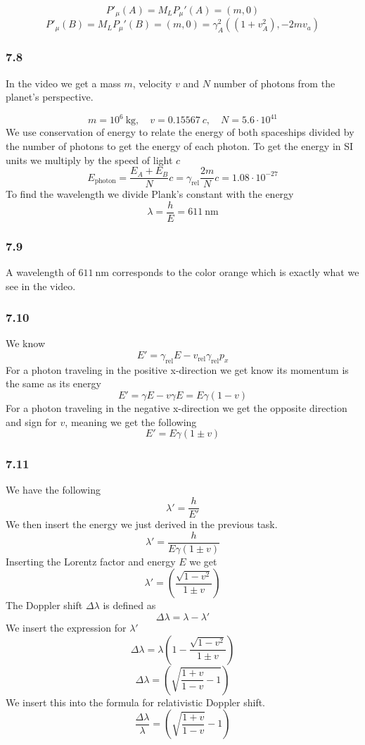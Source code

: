 \documentclass[reprint,english,notitlepage]{revtex4-2}
\begin{document}
\[
P'_{μ}(A) = M_L P_{μ}'(A) = (m,0)
\]
\[
  P'_{μ}(B) = M_L P_{μ}'(B) = (m,0) = γ^{2}_{A}((1 + v^{2}_{A}), - 2mv_{a})
\]

\subsubsection*{7.8}
In the video we get a mass $ m $, velocity $ v $ and $ N $ number of photons from the planet's perspective. 

\[
m = 10^{6}\ \text{kg}, \quad v = 0.15567\ c, \quad N = 5.6 ⋅ 10^{41}
\]
We use conservation of energy to relate the energy of both spaceships divided by the number of photons to get the energy of each photon. To get the energy in SI units we multiply by the speed of light $ c $
\[
E_{\text{photon}} = \frac{E_{A} + E_{B}}{N} c = γ_{\text{rel}} \frac{2m}{N}c = 1.08 ⋅ 10^{-27}
\]
To find the wavelength we divide Plank's constant with the energy 
\[
λ = \frac{h}{E} = 611\ \text{nm}
\]

\subsubsection*{7.9}
A wavelength of $  611\ \text{nm} $ corresponds to the color orange which is exactly what we see in the video.

\subsubsection*{7.10}
We know
\[
E' = γ_{\text{rel}}E - v_{\text{rel}} γ_{\text{rel}} p_{x}
\]
For a photon traveling in the positive x-direction we get know its momentum is the same as its energy
\[
E' = γE - v γ E = E γ(1 - v)
\]
For a photon traveling in the negative x-direction we get the opposite direction and sign for $ v $, meaning we get the following
\[
E' = E γ(1 ± v)
\]

\subsubsection*{7.11}
We have the following 
\[
λ' = \frac{h}{E'}
\]
We then insert the energy we just derived in the previous task. 
\[
λ' = \frac{h}{E γ(1 \pm v)}
\]
Inserting the Lorentz factor and energy $ E $ we get 
\[
λ' = \left( \frac{\sqrt{1 - v^{2}} }{1 \pm v} \right) 
\]
The Doppler shift $ Δλ $ is defined as
\[
Δλ = λ - λ' 
\]
We insert the expression for $ λ' $
\[
Δλ = λ\left( 1 - \frac{\sqrt{1 - v^{2}} }{1 \pm v} \right) 
\]
\[
Δλ = \left( \sqrt{\frac{1 + v}{1 - v} - 1}  \right) 
\]
We insert this into the formula for relativistic Doppler shift. 
\[
\frac{Δλ}{λ} = \left( \sqrt{\frac{1 + v}{1 - v}}  - 1 \right) 
\]
\end{document}
